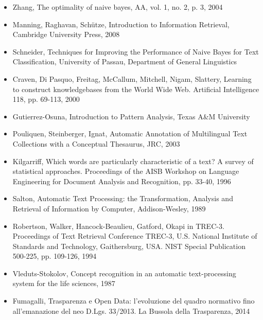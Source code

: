 \documentclass{article}
\theoremstyle{plain}
\theoremstyle{definition}
\begin{document}
\begin{itemize}
\item Zhang, The optimality of naive bayes, AA, vol. 1, no. 2, p. 3, 2004
\item Manning, Raghavan, Schütze, Introduction to Information Retrieval, Cambridge University Press, 2008
\item Schneider, Techniques for Improving the Performance of Naive Bayes for Text Classification, University of Passau, Department of General Linguistics
\item Craven, Di Pasquo, Freitag, McCallum, Mitchell, Nigam, Slattery, Learning to construct knowledgebases from the World Wide Web. Artificial Intelligence 118, pp. 69-113, 2000
\item Gutierrez-Osuna, Introduction to Pattern Analysis, Texas A\&M University
\item Pouliquen, Steinberger, Ignat, Automatic Annotation of Multilingual Text Collections with a Conceptual Thesaurus, JRC, 2003
\item Kilgarriff, Which words are particularly  
characteristic of a text? A survey of statistical approaches. Proceedings of the AISB Workshop on Language Engineering for Document Analysis and Recognition, pp. 33-40, 1996
\item Salton, Automatic Text Processing: the Transformation, Analysis and Retrieval of Information by Computer, Addison-Wesley, 1989
\item Robertson, Walker, Hancock-Beaulieu, Gatford, Okapi in TREC-3. Proceedings of Text Retrieval Conference  TREC-3, U.S. National Institute of Standards and Technology,   
Gaithersburg, USA. NIST Special Publication 500-225, pp. 109-126, 1994
\item Vleduts-Stokolov, Concept recognition in an automatic text-processing system for the life sciences, 1987
\item Fumagalli, Trasparenza e Open Data: l'evoluzione del quadro normativo fino all'emanazione del neo D.Lgs. 33/2013. La Bussola della Trasparenza, 2014
\end{itemize}

\newpage
\end{document}
